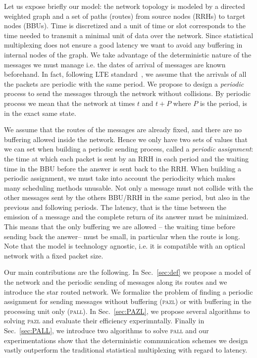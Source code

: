 \documentclass[10pt, conference, letterpaper]{IEEEtran}
\newcommand\pazl{\textsc{pazl}\xspace}
\newcommand\pall{\textsc{pall}\xspace}
\begin{document}
Let us expose briefly our model: the network topology is modeled by a directed weighted graph and a set of paths (routes) from source nodes (RRHs) to target nodes (BBUs). Time is discretized and a unit of time or slot corresponds to the time needed to transmit a minimal unit of data over the network. Since statistical multiplexing does not ensure a good latency we want to avoid any  buffering in internal nodes of the graph.  We take advantage of the deterministic nature of the messages we must manage i.e. the dates of arrival of messages are known beforehand. In fact, following LTE standard~\cite{bouguen2012lte}, we assume that the arrivals of all the packets are periodic with the same period. We propose to design a \emph{periodic} process to send the messages through the network without collisions. By periodic process we mean that the network at times $t$ and $t+P$ where $P$ is the period, is in the exact same state. 

We assume that the routes of the messages are already fixed, and there are no buffering allowed inside the network. Hence we only have two sets of values that we can set when building a periodic sending process, called a \emph{periodic assignment}: the time at which each packet is sent by an RRH in each period and the waiting time in the BBU before the answer is sent back to the RRH. When building a periodic assignment, we must take into account the periodicity which makes many scheduling methods unusable. Not only a message must not collide with the other messages sent by the others BBU/RRH in the same period, but also in the previous and following periods. The latency, that is the time between the emission of a message and the complete return of its answer must be minimized. This means that the only buffering we are allowed -- the waiting time before sending back the answer-- must be small, in particular when the route is long. Note that the model is technology agnostic, i.e. it is compatible with an optical network with a fixed packet size.   

Our main contributions are the following.
 In Sec.~\ref{sec:def} we propose a model of the network and the periodic sending of messages along its routes and we introduce the star routed network. We formalize the problem of finding a periodic assignment for sending messages without buffering (\pazl) or with buffering in the processing unit only (\pall). In Sec.~\ref{sec:PAZL}, we propose several algorithms to solving \pazl and evaluate their efficiency experimntally. Finally in Sec.~\ref{sec:PALL}, we introduce two algorithms to solve \pall and our experimentations show that the deterministic communication schemes we design vastly outperform the traditional statistical multiplexing with regard to latency. 
 
\end{document}
